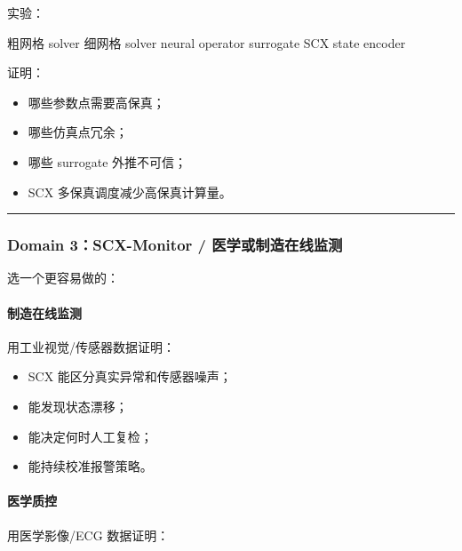 \documentclass[
  12pt,
]{ctexart}
\newenvironment{Shaded}{}{}
\newcommand{\NormalTok}[1]{#1}
\providecommand{\tightlist}{%
  \setlength{\itemsep}{0pt}\setlength{\parskip}{0pt}}
\begin{document}
实验：

\begin{Shaded}
\begin{Highlighting}[]
\NormalTok{粗网格 solver}
\NormalTok{细网格 solver}
\NormalTok{neural operator}
\NormalTok{surrogate}
\NormalTok{SCX state encoder}
\end{Highlighting}
\end{Shaded}

证明：

\begin{itemize}
\tightlist
\item
  哪些参数点需要高保真；
\item
  哪些仿真点冗余；
\item
  哪些 surrogate 外推不可信；
\item
  SCX 多保真调度减少高保真计算量。
\end{itemize}

\begin{center}\rule{0.5\linewidth}{0.5pt}\end{center}

\subsubsection{Domain 3：SCX-Monitor /
医学或制造在线监测}\label{domain-3scx-monitor-ux533bux5b66ux6216ux5236ux9020ux5728ux7ebfux76d1ux6d4b}

选一个更容易做的：

\paragraph{制造在线监测}\label{ux5236ux9020ux5728ux7ebfux76d1ux6d4b}

用工业视觉/传感器数据证明：

\begin{itemize}
\tightlist
\item
  SCX 能区分真实异常和传感器噪声；
\item
  能发现状态漂移；
\item
  能决定何时人工复检；
\item
  能持续校准报警策略。
\end{itemize}

\paragraph{医学质控}\label{ux533bux5b66ux8d28ux63a7}

用医学影像/ECG 数据证明：
\end{document}

